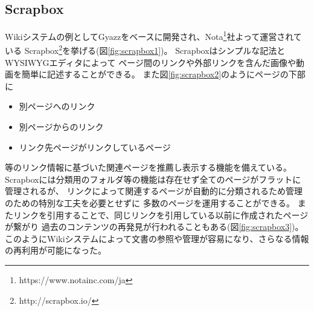 \subsection{Scrapbox}
Wikiシステムの例としてGyazz\cite{Gyazz}をベースに開発され、Nota\footnote{\textsf{https://www.notainc.com/ja}}社よって運営されている
Scrapbox\footnote{http://scrapbox.io/}を挙げる(図\ref{fig:scrapbox1})。
Scrapboxはシンプルな記法とWYSIWYGエディタによって
ページ間のリンクや外部リンクを含んだ画像や動画を簡単に記述することができる。
また図\ref{fig:scrapbox2}のようにページの下部に
\begin{itemize}
    \item 別ページへのリンク
    \item 別ページからのリンク
    \item リンク先ページがリンクしているページ
\end{itemize}等のリンク情報に基づいた関連ページを推薦し表示する機能を備えている。
Scrapboxには分類用のフォルダ等の機能は存在せず全てのページがフラットに管理されるが、
リンクによって関連するページが自動的に分類されるため管理のための特別な工夫を必要とせずに
多数のページを運用することができる。
またリンクを引用することで、同じリンクを引用している以前に作成されたページが繋がり
過去のコンテンツの再発見が行われることもある(図\ref{fig:scrapbox3})。
このようにWikiシステムによって文書の参照や管理が容易になり、さらなる情報の再利用が可能になった。

